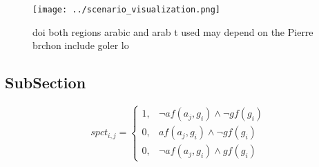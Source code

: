 \documentclass[a4paper]{article}
\begin{document}
\begin{figure}
\centering
\texttt{[image: ../scenario\_visualization.png]}
\caption{ doi both regions arabic and arab t used may depend on the Pierre brchon include goler lo
}
\end{figure}
 
\subsection{SubSection}

\begin{equation}
spct_{i,j} =
\begin{cases}
1, & \text{$\neg af(a_j,g_i) \wedge \neg gf(g_i)$}\\
0, & \text{$af(a_j,g_i) \wedge \neg gf(g_i)$}\\
0, & \text{$\neg af(a_j,g_i) \wedge gf(g_i)$}
\end{cases}
\end{equation}
\end{document}
